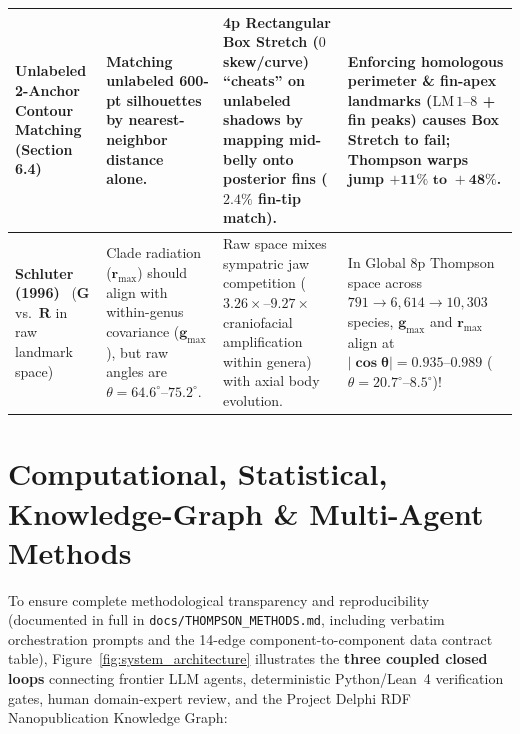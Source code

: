 \documentclass[11pt,a4paper]{article}
\theoremstyle{definition}
\theoremstyle{remark}
\begin{document}
\begin{table}[H]
{\begin{tabular}{@{}p{}p{}p{}p{}@{}}
\midrule
\textbf{Unlabeled 2-Anchor Contour Matching} (Section 6.4) & Matching unlabeled 600-pt silhouettes by nearest-neighbor distance alone. & 4p Rectangular Box Stretch ($0$ skew/curve) ``cheats'' on unlabeled shadows by mapping mid-belly onto posterior fins ($2.4\%$ fin-tip match). & Enforcing homologous perimeter \& fin-apex landmarks ($\mathrm{LM}\,1\text{--}8$ + fin peaks) causes Box Stretch to fail; Thompson warps jump $\mathbf{+11\%\text{ to }+48\%}$. \\
\midrule
\textbf{Schluter (1996)}~\cite{Schluter1996} ($\mathbf{G}$ vs.\ $\mathbf{R}$ in raw landmark space) & Clade radiation ($\mathbf{r}_{\max}$) should align with within-genus covariance ($\mathbf{g}_{\max}$), but raw angles are $\theta = 64.6^\circ\text{--}75.2^\circ$. & Raw space mixes sympatric jaw competition ($3.26\times\text{--}9.27\times$ craniofacial amplification within genera) with axial body evolution. & In Global 8p Thompson space across $791 \to 6{,}614 \to 10{,}303$ species, $\mathbf{g}_{\max}$ and $\mathbf{r}_{\max}$ align at $\mathbf{|\cos\theta| = 0.935\text{--}0.989}$ ($\theta = 20.7^\circ\text{--}8.5^\circ$)! \\
\bottomrule
\end{tabular}%
}
\end{table}

\section{Computational, Statistical, Knowledge-Graph \& Multi-Agent Methods}
\label{sec:methods_provenance}

To ensure complete methodological transparency and reproducibility (documented in full in \texttt{docs/THOMPSON\_METHODS.md}, including verbatim orchestration prompts and the 14-edge component-to-component data contract table), Figure~\ref{fig:system_architecture} illustrates the \textbf{three coupled closed loops} connecting frontier LLM agents, deterministic Python/Lean~4 verification gates, human domain-expert review, and the Project Delphi RDF Nanopublication Knowledge Graph:
\end{document}
